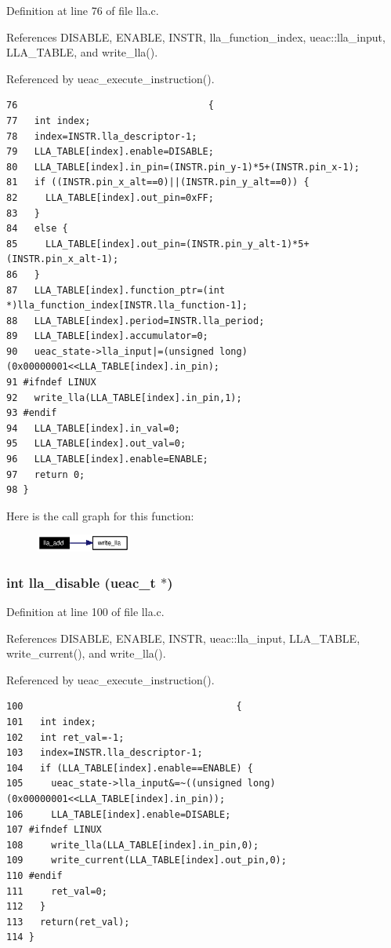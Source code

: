 Definition at line 76 of file lla.c.

References DISABLE, ENABLE, INSTR, lla\_\-function\_\-index, ueac::lla\_\-input, LLA\_\-TABLE, and write\_\-lla().

Referenced by ueac\_\-execute\_\-instruction().

\footnotesize\begin{verbatim}76                                  {
77   int index;
78   index=INSTR.lla_descriptor-1;
79   LLA_TABLE[index].enable=DISABLE;
80   LLA_TABLE[index].in_pin=(INSTR.pin_y-1)*5+(INSTR.pin_x-1);
81   if ((INSTR.pin_x_alt==0)||(INSTR.pin_y_alt==0)) {
82     LLA_TABLE[index].out_pin=0xFF;
83   }
84   else {
85     LLA_TABLE[index].out_pin=(INSTR.pin_y_alt-1)*5+(INSTR.pin_x_alt-1);
86   }
87   LLA_TABLE[index].function_ptr=(int *)lla_function_index[INSTR.lla_function-1];
88   LLA_TABLE[index].period=INSTR.lla_period;
89   LLA_TABLE[index].accumulator=0;
90   ueac_state->lla_input|=(unsigned long)(0x00000001<<LLA_TABLE[index].in_pin);
91 #ifndef LINUX 
92   write_lla(LLA_TABLE[index].in_pin,1);
93 #endif 
94   LLA_TABLE[index].in_val=0;
95   LLA_TABLE[index].out_val=0;
96   LLA_TABLE[index].enable=ENABLE;
97   return 0;
98 }
\end{verbatim}\normalsize 




Here is the call graph for this function:\begin{figure}[H]
\begin{center}
\leavevmode
\includegraphics[width=88pt]{lla_8h_a4_cgraph}
\end{center}
\end{figure}
\subsubsection{\setlength{\rightskip}{0pt plus 5cm}int lla\_\-disable ({\bf ueac\_\-t} $\ast$)}\label{lla_8h_a5}




Definition at line 100 of file lla.c.

References DISABLE, ENABLE, INSTR, ueac::lla\_\-input, LLA\_\-TABLE, write\_\-current(), and write\_\-lla().

Referenced by ueac\_\-execute\_\-instruction().

\footnotesize\begin{verbatim}100                                      {
101   int index;
102   int ret_val=-1;
103   index=INSTR.lla_descriptor-1;
104   if (LLA_TABLE[index].enable==ENABLE) {
105     ueac_state->lla_input&=~((unsigned long)(0x00000001<<LLA_TABLE[index].in_pin));
106     LLA_TABLE[index].enable=DISABLE;
107 #ifndef LINUX    
108     write_lla(LLA_TABLE[index].in_pin,0);
109     write_current(LLA_TABLE[index].out_pin,0);
110 #endif 
111     ret_val=0;
112   }
113   return(ret_val);
114 }
\end{verbatim}\normalsize 




